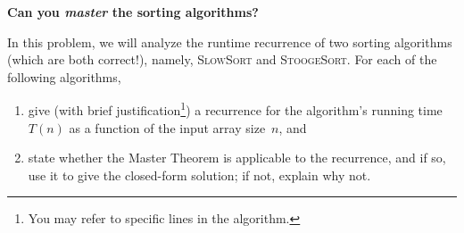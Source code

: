 \documentclass[11pt,addpoints,answers]{exam}
\begin{document}
\begin{questions}
\begin{parts}
    \begin{solution}

    \end{solution}

\end{parts}

    \question \textbf{Can you \emph{master} the sorting algorithms?}
    
    In this problem, we will analyze the runtime recurrence of two sorting algorithms (which are both correct!), namely,  \textsc{SlowSort} and \textsc{StoogeSort}. For each of the following algorithms,
    \begin{enumerate}
        \item give (with brief justification\footnote{You may refer to specific lines in the algorithm.}) a recurrence for the algorithm's running time $T(n)$ as a function of the input array size~$n$, and
        \item state whether the Master Theorem is applicable to the recurrence, and if so, use it to give the closed-form solution; if not, explain why not. 
    \end{enumerate}

\end{questions}
\end{document}
